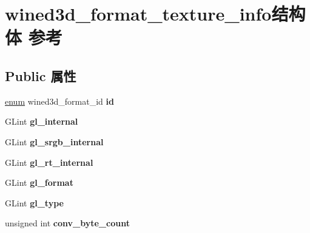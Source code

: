 \hypertarget{structwined3d__format__texture__info}{}\section{wined3d\+\_\+format\+\_\+texture\+\_\+info结构体 参考}
\label{structwined3d__format__texture__info}
\subsection*{Public 属性}
\begin{DoxyCompactItemize}
\item 
\mbox{\label{structwined3d__format__texture__info_a9acca0bdb32d9233ee0993a4292267fb}} 
\hyperlink{interfaceenum}{enum} wined3d\+\_\+format\+\_\+id {\bfseries id}
\item 
\mbox{\label{structwined3d__format__texture__info_a7db61854bfebbe933f300406dd71d2f2}} 
G\+Lint {\bfseries gl\+\_\+internal}
\item 
\mbox{\label{structwined3d__format__texture__info_a1ed0682d042d979b05d06f0fcc20b3d6}} 
G\+Lint {\bfseries gl\+\_\+srgb\+\_\+internal}
\item 
\mbox{\label{structwined3d__format__texture__info_ad3017d43241bb23a895a871f554750cd}} 
G\+Lint {\bfseries gl\+\_\+rt\+\_\+internal}
\item 
\mbox{\label{structwined3d__format__texture__info_a11c5481f4d02b5e7a1b39e7a9df6a370}} 
G\+Lint {\bfseries gl\+\_\+format}
\item 
\mbox{\label{structwined3d__format__texture__info_a4a27fe6998827875648f466ee8410b9a}} 
G\+Lint {\bfseries gl\+\_\+type}
\item 
\mbox{\label{structwined3d__format__texture__info_aeb626a970f49407592027dbeb584ccf6}} 
unsigned int {\bfseries conv\+\_\+byte\+\_\+count}
\item 
\mbox{\label{structwined3d__format__texture__info_adce653dd982f2b7d14058f7ddc572515}} 

\end{DoxyCompactItemize}
